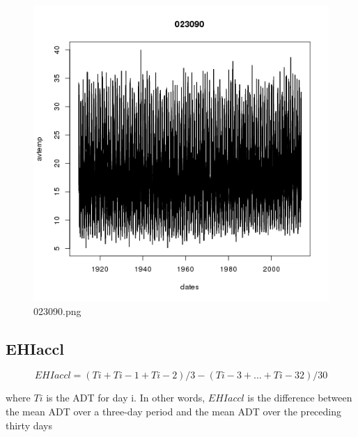 \documentclass[a4paper]{article}
\begin{document}
\begin{figure}[!h]
\centering
\includegraphics[width=\textwidth]{023090.png}
\caption{023090.png}
\label{fig:023090.png}
\end{figure}
\clearpage

\subsection{EHI{accl}}

 $$EHI{accl} = (T{i} + T{i-1} + T{i-2})/3 - (T{i-3} + \ldots + T{i-32})/30$$
 
 where 
 $T{i}$ is the ADT for day i. 
 In other words, $EHI{accl}$ is the difference between the mean ADT over a three-day period and the mean ADT over the preceding thirty days
 
\end{document}
